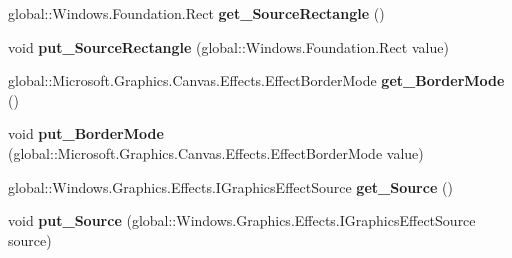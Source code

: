 \begin{DoxyCompactItemize}
\item 
\mbox{\label{interface_microsoft_1_1_graphics_1_1_canvas_1_1_effects_1_1_i_crop_effect_afc0de3bee5f831a8dfac30ecac6a898d}} 
global\+::\+Windows.\+Foundation.\+Rect {\bfseries get\+\_\+\+Source\+Rectangle} ()
\item 
\mbox{\label{interface_microsoft_1_1_graphics_1_1_canvas_1_1_effects_1_1_i_crop_effect_ad88fede8cf2dfab050189939a47de349}} 
void {\bfseries put\+\_\+\+Source\+Rectangle} (global\+::\+Windows.\+Foundation.\+Rect value)
\item 
\mbox{\label{interface_microsoft_1_1_graphics_1_1_canvas_1_1_effects_1_1_i_crop_effect_aedc53db53d8d6e57c40517ab6a3758d0}} 
global\+::\+Microsoft.\+Graphics.\+Canvas.\+Effects.\+Effect\+Border\+Mode {\bfseries get\+\_\+\+Border\+Mode} ()
\item 
\mbox{\label{interface_microsoft_1_1_graphics_1_1_canvas_1_1_effects_1_1_i_crop_effect_ae88c621641cd9be11414409037414d5e}} 
void {\bfseries put\+\_\+\+Border\+Mode} (global\+::\+Microsoft.\+Graphics.\+Canvas.\+Effects.\+Effect\+Border\+Mode value)
\item 
\mbox{\label{interface_microsoft_1_1_graphics_1_1_canvas_1_1_effects_1_1_i_crop_effect_ae17d9daa0439d30e16235dde28fde47d}} 
global\+::\+Windows.\+Graphics.\+Effects.\+I\+Graphics\+Effect\+Source {\bfseries get\+\_\+\+Source} ()
\item 
\mbox{\label{interface_microsoft_1_1_graphics_1_1_canvas_1_1_effects_1_1_i_crop_effect_aad283c62ebd28ad1ba136787595806fa}} 
void {\bfseries put\+\_\+\+Source} (global\+::\+Windows.\+Graphics.\+Effects.\+I\+Graphics\+Effect\+Source source)
\item 
\mbox{\label{interface_microsoft_1_1_graphics_1_1_canvas_1_1_effects_1_1_i_crop_effect_afc0de3bee5f831a8dfac30ecac6a898d}} 

\end{DoxyCompactItemize}
